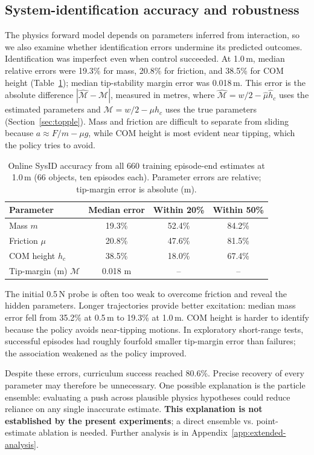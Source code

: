 \documentclass[12pt]{article}
\begin{document}
\subsection{System-identification accuracy and robustness}\label{sec:identifiability}
The physics forward model depends on parameters inferred from interaction, so we also examine whether identification errors undermine its predicted outcomes. Identification was imperfect even when control succeeded. At 1.0\,m, median relative errors were 19.3\% for mass, 20.8\% for friction, and 38.5\% for COM height (Table~\ref{tab:sysid}); median tip-stability margin error was 0.018\,m. This error is the absolute difference $|\hat{\mathcal M}-\mathcal M|$, measured in metres, where $\hat{\mathcal M}=w/2-\hat\mu\hat h_c$ uses the estimated parameters and $\mathcal M=w/2-\mu h_c$ uses the true parameters (Section~\ref{sec:topple}). Mass and friction are difficult to separate from sliding because $a\approx F/m-\mu g$, while COM height is most evident near tipping, which the policy tries to avoid.


\begin{table}[H]
\centering
\small
\begin{tabular}{lccc}
\toprule
Parameter & Median error & Within 20\% & Within 50\% \\
\midrule
Mass $m$ & 19.3\% & 52.4\% & 84.2\% \\
Friction $\mu$ & 20.8\% & 47.6\% & 81.5\% \\
COM height $h_c$ & 38.5\% & 18.0\% & 67.4\% \\
Tip-margin (m) $\mathcal{M}$ & 0.018 m & -- & -- \\
\bottomrule
\end{tabular}
\caption{Online SysID accuracy from all 660 training episode-end estimates at 1.0\,m (66 objects, ten episodes each). Parameter errors are relative; tip-margin error is absolute (m).}
\label{tab:sysid}
\end{table}
The initial 0.5\,N probe is often too weak to overcome friction and reveal the hidden parameters. Longer trajectories provide better excitation: median mass error fell from 35.2\% at 0.5\,m to 19.3\% at 1.0\,m. COM height is harder to identify because the policy avoids near-tipping motions. In exploratory short-range tests, successful episodes had roughly fourfold smaller tip-margin error than failures; the association weakened as the policy improved.

Despite these errors, curriculum success reached 80.6\%. Precise recovery of every parameter may therefore be unnecessary. One possible explanation is the particle ensemble: evaluating a push across plausible physics hypotheses could reduce reliance on any single inaccurate estimate. \textbf{This explanation is not established by the present experiments}; a direct ensemble vs. point-estimate ablation is needed. Further analysis is in Appendix~\ref{app:extended-analysis}.
\end{document}
